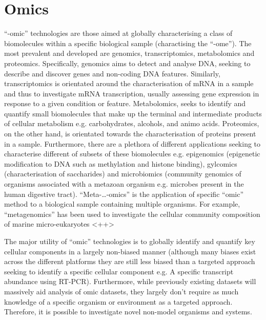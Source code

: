 \section{Omics}
``-omic'' technologies are those aimed at globally characterising a class of biomolecules 
within a specific biological sample (charactising the ``-ome''). The most prevalent and developed 
are genomics, transcriptomics, metabolomics and proteomics. Specifically, genomics aims to detect and analyse DNA, seeking to describe and discover genes and non-coding DNA
features. Similarly, transcriptomics is orientated around the characterisation
of mRNA in a sample and thus to investigate mRNA transcription, usually assessing
gene expression in response to a given condition or feature. 
Metabolomics, seeks to identify and quantify small biomolecules that make up the terminal and
intermediate products of cellular metabolism e.g. carbohydrates, alcohols, and animo acids.
Proteomics, on the other hand, is orientated towards the characterisation  
of proteins present in a sample. 
Furthermore, there are a plethora of different applications seeking to characterise
different of subsets of these biomolecules e.g. epigenomics (epigenetic modification to DNA such as methylation
and histone binding), gylcomics (characterisation of saccharides) and microbiomics (community genomics of organisms associated with a metazoan organism e.g. microbes present in the human digestive tract).
``Meta-\ldots-omics'' is the application of specific ``omic'' method to a biological sample 
containing multiple organisms. For example, ``metagenomics'' has been used to investigate
the cellular community composition of marine micro-eukaryotes \citep{}<++> %

The major utility of ``omic'' technologies is to globally identify and quantify key cellular components
in a largely non-biased manner (although many biases exist across the different platforms
they are still less biased than a targeted approach seeking to identify a specific cellular component
e.g. A specific transcript abundance using RT-PCR). Furthermore, while previously existing
datasets will massively aid analysis of omic datasets, they largely don't require
as much  knowledge of a specific organism or environment as a targeted approach.
Therefore, it is possible to investigate novel non-model organisms and systems.

